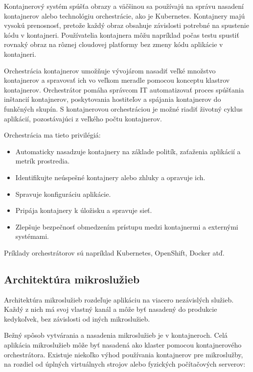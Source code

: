 Kontajnerový systém spúšťa obrazy a väčšinou sa používajú na správu nasadení kontajnerov alebo technológiu orchestrácie, ako je Kubernetes. Kontajnery majú vysokú prenosnosť, pretože každý obraz obsahuje závislosti potrebné na spustenie kódu v kontajneri. Používatelia kontajnera môžu napríklad počas testu spustiť rovnaký obraz na rôznej cloudovej platformy bez zmeny kódu aplikácie v kontajneri.

Orchestrácia kontajnerov umožňuje vývojárom nasadiť veľké množstvo kontajnerov a spravovať ich vo veľkom meradle pomocou konceptu klastrov kontajnerov. Orchestrátor pomáha správcom IT automatizovať proces spúšťania inštancií kontajnerov, poskytovania hostiteľov a spájania kontajnerov do funkčných skupín. S kontajnerovou orchestráciou je možné riadiť životný cyklus aplikácií, pozostávajúci z veľkého počtu kontajnerov.

Orchestrácia ma tieto privilégiá:

\begin{itemize}
	\item Automaticky nasadzuje kontajnery na základe politík, zaťaženia aplikácií a metrík prostredia.
	\item Identifikujte neúspešné kontajnery alebo zhluky a opravuje ich.
	\item Spravuje konfiguráciu aplikácie.
	\item Pripája kontajnery k úložisku a spravuje sieť.
	\item Zlepšuje bezpečnosť obmedzením prístupu medzi kontajnermi a externými systémami.
\end{itemize}

Príklady orchestrátorov sú napríklad Kubernetes, OpenShift, Docker atď.

\subsection{Architektúra mikroslužieb}

Architektúra mikroslužieb rozdeľuje aplikáciu na viacero nezávislých služieb. Každý z nich má svoj vlastný kanál a môže byť nasadený do produkcie kedykoľvek, bez závislosti od iných mikroslužieb.

Bežný spôsob vytvárania a nasadenia mikroslužieb je v kontajneroch. Celá aplikácia mikroslužieb môže byť nasadená ako klaster pomocou kontajnerového orchestrátora. Existuje niekoľko výhod používania kontajnerov pre mikroslužby, na rozdiel od úplných virtuálnych strojov alebo fyzických počítačových serverov: \cite{microservices}

